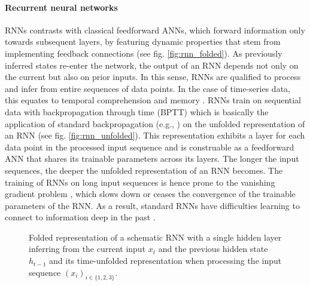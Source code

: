\paragraph*{Recurrent neural networks} ${}$\\
RNNs contrasts with classical feedforward ANNs, 
which forward information only towards subsequent layers, 
by featuring dynamic properties that stem 
from implementing feedback connections
\cite{Hu2008} (see fig. \ref{fig:rnn_folded}).
As previously inferred states re-enter the network, 
the output of an RNN depends not only on the current 
but also on prior inputs. 
In this sense, RNNs are qualified to process and infer from 
entire sequences of data points. 
In the case of time-series data, 
this equates to temporal comprehension and memory \cite{ICE2020}.
RNNs train on sequential data with backpropagation through time (BPTT) 
\cite{pascanu2013difficulty}
which is basically the application of standard backpropagation
(e.g., \cite{Rojas1996})
on the unfolded representation of an RNN
(see fig. \ref{fig:rnn_unfolded}).
This representation exhibits a layer 
for each data point in the processed input sequence 
and is construable as a feedforward ANN 
that shares its trainable parameters across its layers. 
The longer the input sequences,
the deeper the unfolded representation of an RNN becomes. 
The training of RNNs on long input sequences 
is hence prone to the 
vanishing gradient problem \cite{hochreiter1991untersuchungen},
which slows down or ceases the convergence 
of the trainable parameters of the RNN.
As a result, standard RNNs have difficulties 
learning to connect to information deep in the past \cite{Bengio1994}.
\begin{figure}[h]
    \centering
    \hspace*{2cm}                
    \caption[
        Folded and unfolded representation of an RNN
    ]{
        Folded representation of a 
        schematic RNN with a single hidden layer 
        inferring from the current input $x_t$
        and the previous hidden state $h_{t-1}$
        and its time-unfolded representation
        when processing the input sequence
        $\left(x_i\right)_{i\in\{1, 2, 3\}}$.
        \label{fig:rnn_folded_unfolded}
    }
\end{figure}




